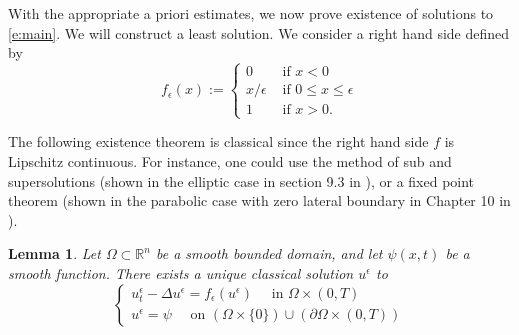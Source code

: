 \documentclass{amsart}
\newtheorem{lemma}[theorem]{Lemma}
\numberwithin{equation}{section}
\begin{document}
With the appropriate a priori estimates, we now prove existence of solutions to  \eqref{e:main}. We will construct a least solution. We consider a right hand side defined by 
\begin{equation} \label{e:rhs}
 f_{\epsilon}(x):=
 \begin{cases}
  0 &\text{ if } x<0 \\
  x/\epsilon  &\text{ if } 0\leq x \leq \epsilon \\
  1  &\text{ if } x>0. 
 \end{cases}
\end{equation}

The following existence theorem is classical since the right hand side $f$ is Lipschitz continuous. For instance, one could use the method of sub and supersolutions (shown in the elliptic case in section 9.3 in \cite{e10}), or a fixed point theorem (shown in the parabolic case with zero lateral boundary in Chapter 10 in \cite{r13}).
\begin{lemma} \label{l:eandu}
 Let $\Omega\subset \mathbb{R}^n$ be a smooth bounded domain, and let $\psi(x,t)$ be a smooth function. There exists a unique classical solution $u^{\epsilon}$ to 
 \begin{equation} \label{e:epsilon}
 \begin{cases}
  u^{\epsilon}_t - \Delta u^{\epsilon} = f_{\epsilon}(u^{\epsilon}) \quad \text{ in } \Omega \times (0,T) \\
  u^{\epsilon}=\psi \quad \text{ on } (\Omega \times \{0\})\cup (\partial \Omega \times (0,T))
 \end{cases}
 \end{equation}
\end{lemma}
\end{document}
